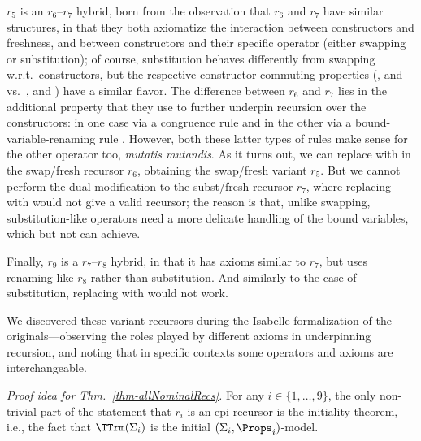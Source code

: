 $r_5$ %
is an $r_6$--$r_7$ hybrid, %
born from the observation that 
$r_6$ and $r_7$ 
have %
similar structures, in that they both axiomatize the interaction between %
constructors and freshness, %
and between constructors and their specific operator (either swapping or substitution); %
of course, substitution behaves differently from swapping w.r.t.\ constructors, but the respective constructor-commuting properties (\SbVr{}, \SbAp{} and \SbLm{} vs.\ \SwVr{}, \SwAp{} and \SwLm{}) have a similar flavor.
The difference between $r_6$ and $r_7$ lies in the additional property that they use to further underpin recursion over the constructors: in one case via a congruence rule \SwCg{} and in the other via a bound-variable-renaming rule \SbBvr{}. However, both these latter types of rules make sense for the other operator too, \emph{mutatis mutandis}. 
%
As it turns out, we can replace \SwCg{} with \SbBvr{} in the swap/fresh recursor 
$r_6$, obtaining the swap/fresh variant $r_5$. 
%
But we cannot perform the dual modification to the subst/fresh recursor $r_7$, where replacing  \SbBvr{} with \SbCg{} would not give a valid recursor; the reason is that, unlike swapping, substitution-like operators need a more delicate handling of the bound variables, which \SbBvr{} but not \SbCg{} can achieve. 

Finally, $r_9$ is a $r_7$--$r_8$ hybrid, %
in that it has axioms similar to $r_7$, but uses renaming like $r_8$ %
 rather than substitution. 
  And similarly to the case of substitution, replacing \RnBvr{} with \RnCg{} would not work. 

We %
discovered these variant recursors 
during the Isabelle formalization of the originals---observing the roles played by different axioms in underpinning recursion, and noting that in specific contexts some operators and axioms are interchangeable.  


\smallskip
\emph{Proof idea for Thm.~\ref{thm-allNominalRecs}.}
%
For any $i\in \{1,\ldots,9\}$, the only non-trivial part of the statement that 
$r_i$ is an epi-recursor is the initiality theorem, i.e., the fact that $\TTrm(\Sigma_i)$ is the initial $(\Sigma_i,\Props_i)$-model. 

